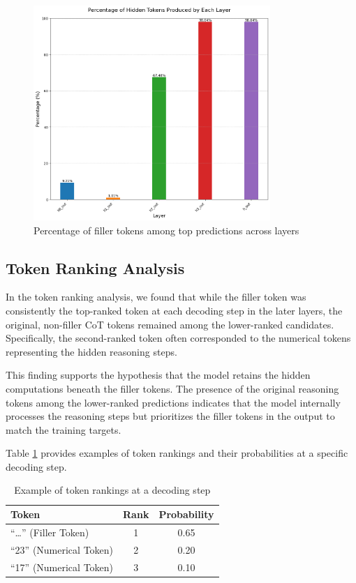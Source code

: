 \documentclass{article}
\begin{document}
\begin{figure}[H]
\centering
\includegraphics[width=0.8\textwidth]{hidden_tokens_percentage_by_layer.png}
\caption{Percentage of filler tokens among top predictions across layers}
\label{fig:hidden_token_percentages}
\end{figure}

\subsection{Token Ranking Analysis}

In the token ranking analysis, we found that while the filler token was consistently the top-ranked token at each decoding step in the later layers, the original, non-filler CoT tokens remained among the lower-ranked candidates. Specifically, the second-ranked token often corresponded to the numerical tokens representing the hidden reasoning steps.

This finding supports the hypothesis that the model retains the hidden computations beneath the filler tokens. The presence of the original reasoning tokens among the lower-ranked predictions indicates that the model internally processes the reasoning steps but prioritizes the filler tokens in the output to match the training targets.

Table \ref{tab:token_ranks} provides examples of token rankings and their probabilities at a specific decoding step.

\begin{table}[H]
\centering
\caption{Example of token rankings at a decoding step}
\begin{tabular}{lcc}
\toprule
\textbf{Token} & \textbf{Rank} & \textbf{Probability} \\
\midrule
``\ldots'' (Filler Token) & 1 & 0.65 \\
``23'' (Numerical Token) & 2 & 0.20 \\
``17'' (Numerical Token) & 3 & 0.10 \\
\bottomrule
\end{tabular}
\label{tab:token_ranks}
\end{table}
\end{document}
